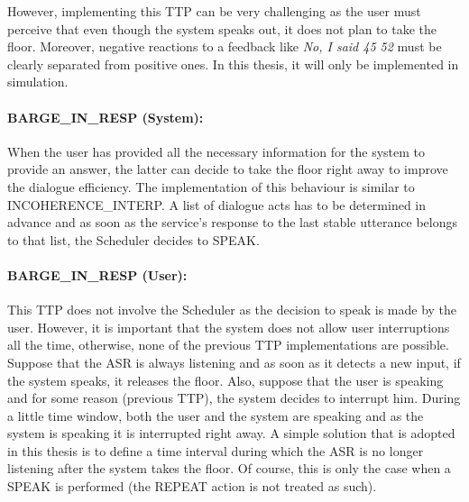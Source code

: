 				However, implementing this TTP can be very challenging as the user must perceive that even though the system speaks out, it does not plan to take the floor. Moreover, negative reactions to a feedback like \textit{No, I said 45 52} must be clearly separated from positive ones. In this thesis, it will only be implemented in simulation.
				
			\paragraph{BARGE\_IN\_RESP (System):} When the user has provided all the necessary information for the system to provide an answer, the latter can decide to take the floor right away to improve the dialogue efficiency. The implementation of this behaviour is similar to INCOHERENCE\_INTERP. A list of dialogue acts has to be determined in advance and as soon as the service's response to the last stable utterance belongs to that list, the Scheduler decides to SPEAK.
			
			\paragraph{BARGE\_IN\_RESP (User):} This TTP does not involve the Scheduler as the decision to speak is made by the user. However, it is important that the system does not allow user interruptions all the time, otherwise, none of the previous TTP implementations are possible. Suppose that the ASR is always listening and as soon as it detects a new input, if the system speaks, it releases the floor. Also, suppose that the user is speaking and for some reason (previous TTP), the system decides to interrupt him. During a little time window, both the user and the system are speaking and as the system is speaking it is interrupted right away. A simple solution that is adopted in this thesis is to define a time interval during which the ASR is no longer listening after the system takes the floor. Of course, this is only the case when a SPEAK is performed (the REPEAT action is not treated as such).
